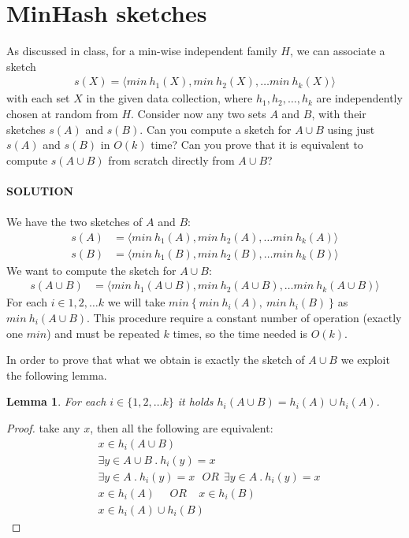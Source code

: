 \documentclass[a4paper]{article}
\newtheorem{lemma}[theorem]{Lemma}
\begin{document}
\section*{MinHash sketches}
As  discussed  in  class,  for  a  min-wise  independent  family $H$, we can associate a sketch
\begin{align*}
s(X) = \langle min\ h_1(X), min\ h_2(X), \dots min\ h_k(X) \rangle
\end{align*}
with each set $X$ in the given data collection, where $h_1, h_2 , \dots, h_k$ are independently chosen at random from $H$. 
Consider now any two sets $A$ and $B$, with their sketches $s(A)$ and $s(B)$. 
Can you compute a sketch for $A \cup B$ using just $s(A)$ and $s(B)$ in $O(k)$ time?
Can you prove that it is equivalent to compute $s(A \cup B)$ from scratch directly from $A \cup B$?
\\
\\
\textbf{SOLUTION}
\\
\\
We have the two sketches of $A$ and $B$:
\begin{align*}
s(A) &= \langle min\ h_1(A), min\ h_2(A), \dots min\ h_k(A) \rangle \\
s(B) &= \langle min\ h_1(B), min\ h_2(B), \dots min\ h_k(B) \rangle
\end{align*}
We want to compute the sketch for $A \cup B$:
\begin{align*}
s(A \cup B) &= \langle min\ h_1(A \cup B), min\ h_2(A \cup B), \dots min\ h_k(A \cup B) \rangle
\end{align*}
For each $i \in {1, 2, \dots k}$ we will take $min\ \{\ min\ h_i(A),\ min\ h_i(B)\ \}$ as $min\ h_i(A \cup B)$.
This procedure require a constant number of operation (exactly one $min$) and must be repeated $k$ times, so the time needed is $O(k)$.

In order to prove that what we obtain is exactly the sketch of $A \cup B$ we exploit the following lemma.
\begin{lemma}
For each $i \in \{ 1, 2, \dots k\}$ it holds $h_i(A \cup B) = h_i(A) \cup h_i(A)$.
\end{lemma}
\begin{proof}
take any $x$, then all the following are equivalent:
\begin{align*}
& x \in h_i(A \cup B) \\
& \exists y \in A \cup B\ .\ h_i(y) = x \\
& \exists y \in A\ .\ h_i(y) = x \ \ \ OR \ \ \exists y \in A\ .\ h_i(y) = x \\
& x \in h_i(A) \ \ \ \ \ \ OR \ \ \ \ \ x \in h_i(B) \\
& x \in h_i(A) \cup h_i(B)
\end{align*}
\end{proof}
\end{document}

